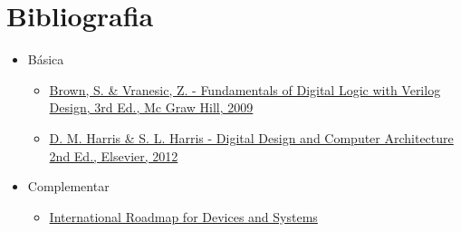 \section{Bibliografia} %


\begin{frame}[allowframebreaks]{\insertsection} 
	\begin{itemize}
		\item Básica
		\begin{itemize}
			\item \href{https://www.google.com.br/search?q=filetype\%3Apdf+Fundamentals+of+Digital+Logic+with+Verilog+Design+&oq=filetype\%3Apdf}{Brown, S. \& Vranesic, Z. - Fundamentals of Digital Logic with Verilog Design, 3rd Ed., Mc Graw Hill, 2009}
			\item \href{https://www.sciencedirect.com/science/book/9780123944245}{D. M. Harris \& S. L. Harris - Digital Design and Computer Architecture 2nd Ed., Elsevier, 2012}
		\end{itemize}
		\item Complementar
		\begin{itemize}
			\item \href{https://irds.ieee.org/}{International Roadmap for Devices and Systems}
		\end{itemize}
	\end{itemize}
\end{frame}


\begin{frame}
	\titlepage
\end{frame} 

